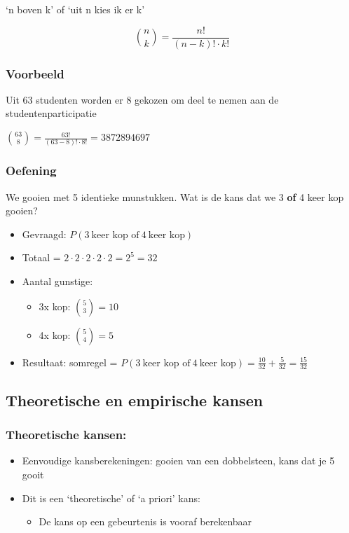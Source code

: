 \documentclass{article}
\begin{document}
`n boven k' of `uit n kies ik er k'

\begin{equation}
    \binom{n}{k} = \frac{n!}{(n-k)! \cdot k!}
\end{equation}

\subsubsection{Voorbeeld}

Uit 63 studenten worden er 8 gekozen om deel te nemen aan de studentenparticipatie

$\binom{63}{8} = \frac{63!}{(63-8)! \cdot 8!} = 3 872 894 697$


\subsubsection{Oefening}

We gooien met 5 identieke munstukken. Wat is de kans dat we 3 \textbf{of} 4 keer kop gooien?

\begin{itemize}
    \item Gevraagd: $P(3\ \text{keer kop of}\ 4\ \text{keer kop})$
    \item Totaal = $2 \cdot 2 \cdot 2 \cdot 2 \cdot 2 = 2^5 = 32$
    \item Aantal gunstige:
    \begin{itemize}
        \item 3x kop: $\binom{5}{3} = 10$
        \item 4x kop: $\binom{5}{4} = 5$
    \end{itemize}
    \item Resultaat: somregel = $P(3\ \text{keer kop of}\ 4\ \text{keer kop}) = \frac{10}{32} + \frac{5}{32} = \frac{15}{32}$
\end{itemize}

\subsection{Theoretische en empirische kansen}

\subsubsection{Theoretische kansen:}

\begin{itemize}
    \item Eenvoudige kansberekeningen: gooien van een dobbelsteen, kans dat je 5 gooit
    \item Dit is een `theoretische' of `a priori' kans:
    \begin{itemize}
        \item De kans op een gebeurtenis is vooraf berekenbaar
    \end{itemize}
\end{itemize}
\end{document}
